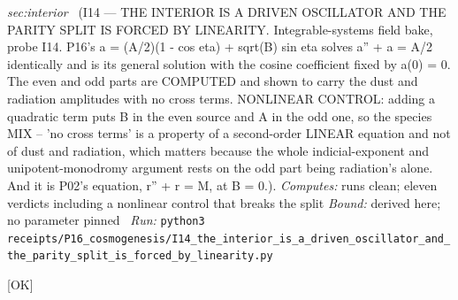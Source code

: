 \begin{description}
\textit{sec:interior} \ (I14 --- THE INTERIOR IS A DRIVEN OSCILLATOR AND THE PARITY SPLIT IS FORCED BY LINEARITY. Integrable-systems field bake, probe I14. P16's a = (A/2)(1 - cos eta) + sqrt(B) sin eta solves a'' + a = A/2 identically and is its general solution with the cosine coefficient fixed by a(0) = 0. The even and odd parts are COMPUTED and shown to carry the dust and radiation amplitudes with no cross terms. NONLINEAR CONTROL: adding a quadratic term puts B in the even source and A in the odd one, so the species MIX -- 'no cross terms' is a property of a second-order LINEAR equation and not of dust and radiation, which matters because the whole indicial-exponent and unipotent-monodromy argument rests on the odd part being radiation's alone. And it is P02's equation, r'' + r = M, at B = 0.). 
\emph{Computes:} runs clean; eleven verdicts including a nonlinear control that breaks the split
 \emph{Bound:} derived here; no parameter pinned
\ \emph{Run:} \texttt{python3 receipts/P16\_cosmogenesis/I14\_the\_interior\_is\_a\_driven\_oscillator\_and\_the\_parity\_split\_is\_forced\_by\_linearity.py}
\item[\rcptlabel{P16_the_progenitor_composition_is_bracketed}{P16R21}\textbf{P16R21}\quad\texttt{P16\_the\_progenitor\_composition\_is\_bracketed}]\hfill\textsf{[OK]}\\

\end{description}
